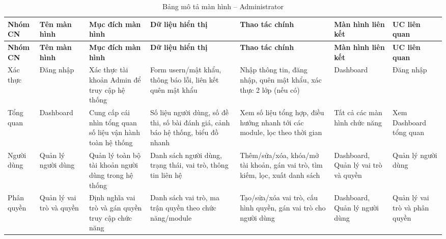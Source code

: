 \documentclass[11pt,a4paper]{article}
\begin{document}
	\begin{landscape}
		\footnotesize
		\begin{longtable}{|>{\raggedright\arraybackslash}p{2.1cm}|>{\raggedright\arraybackslash}p{2.3cm}|>{\raggedright\arraybackslash}p{3.4cm}|>{\raggedright\arraybackslash}p{3.6cm}|>{\raggedright\arraybackslash}p{3.6cm}|>{\raggedright\arraybackslash}p{2.6cm}|>{\raggedright\arraybackslash}p{2.6cm}|}
			\caption{Bảng mô tả màn hình – Administrator}\\
			\hline
			\rowcolor{lightblue}
			\textbf{Nhóm CN} & \textbf{Tên màn hình} & \textbf{Mục đích màn hình} & \textbf{Dữ liệu hiển thị} & \textbf{Thao tác chính} & \textbf{Màn hình liên kết} & \textbf{UC liên quan} \\
			\hline
			\endfirsthead
			\hline
			\rowcolor{lightblue}
			\textbf{Nhóm CN} & \textbf{Tên màn hình} & \textbf{Mục đích màn hình} & \textbf{Dữ liệu hiển thị} & \textbf{Thao tác chính} & \textbf{Màn hình liên kết} & \textbf{UC liên quan} \\
			\hline
			\endhead
			\hline
			\endfoot
			
			Xác thực &
			Đăng nhập &
			Xác thực tài khoản Admin để truy cập hệ thống &
			Form usern/mật khẩu, thông báo lỗi, liên kết quên mật khẩu &
			Nhập thông tin, đăng nhập, quên mật khẩu, xác thực 2 lớp (nếu có) &
			Dashboard &
			Đăng nhập \\
			\hline
			
			Tổng quan &
			Dashboard &
			Cung cấp cái nhìn tổng quan số liệu vận hành toàn hệ thống &
			Số liệu người dùng, số đề thi, số bài đánh giá, cảnh báo hệ thống, biểu đồ nhanh &
			Xem số liệu tổng hợp, điều hướng nhanh tới các module, lọc theo thời gian &
			Tất cả các màn hình chức năng &
			Xem Dashboard tổng quan \\
			\hline
			
			Người dùng &
			Quản lý người dùng &
			Quản lý toàn bộ tài khoản người dùng trong hệ thống &
			Danh sách người dùng, trạng thái, vai trò, thông tin liên hệ &
			Thêm/sửa/xóa, khóa/mở tài khoản, gán vai trò, tìm kiếm, lọc, xuất danh sách &
			Dashboard, Quản lý vai trò và quyền &
			Quản lý người dùng \\
			\hline
			
			Phân quyền &
			Quản lý vai trò và quyền &
			Định nghĩa vai trò và gán quyền truy cập chức năng &
			Danh sách vai trò, ma trận quyền theo chức năng/module &
			Tạo/sửa/xóa vai trò, cấu hình quyền, gán vai trò cho người dùng &
			Dashboard, Quản lý người dùng &
			Quản lý vai trò và phân quyền \\
			\hline
			

\end{longtable}
\end{landscape}
\end{document}

